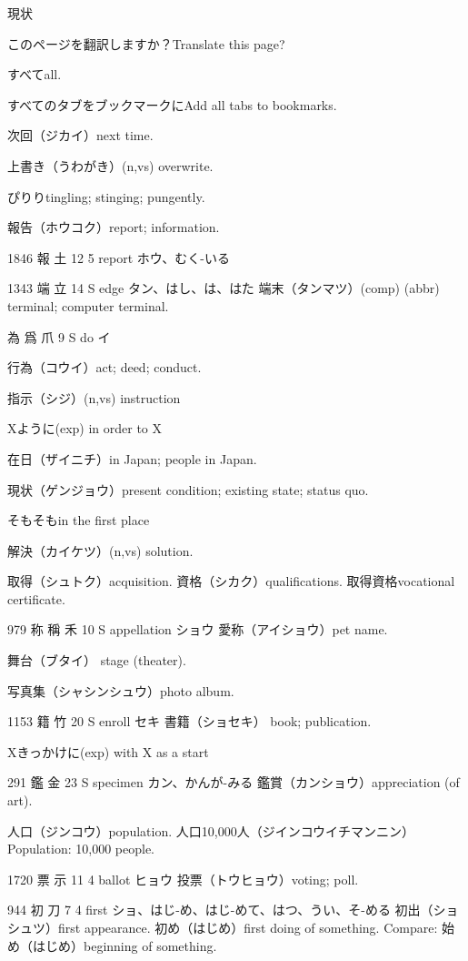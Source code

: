 現状

このページを翻訳しますか？Translate this page?

すべてall.

すべてのタブをブックマークにAdd all tabs to bookmarks.

次回（ジカイ）next time.

上書き（うわがき）(n,vs) overwrite.

ぴりりtingling; stinging; pungently.

報告（ホウコク）report; information.

1846 報  土 12 5  report ホウ、むく-いる

1343 端  立 14 S  edge タン、はし、は、はた
端末（タンマツ）(comp) (abbr) terminal; computer terminal.

為 爲 爪 9 S  do イ

行為（コウイ）act; deed; conduct.

指示（シジ）(n,vs) instruction

Xように(exp) in order to X

在日（ザイニチ）in Japan; people in Japan.

現状（ゲンジョウ）present condition; existing state; status quo.

そもそもin the first place

解決（カイケツ）(n,vs) solution.

取得（シュトク）acquisition.
資格（シカク）qualifications.
取得資格vocational certificate.

979	称	稱	禾	10	S		appellation	ショウ
愛称（アイショウ）pet name.

舞台（ブタイ）
stage (theater).

写真集（シャシンシュウ）photo album.

1153	籍		竹	20	S		enroll	セキ
書籍（ショセキ）
book; publication.

Xきっかけに(exp) with X as a start

291	鑑		金	23	S		specimen	カン、かんが-みる
鑑賞（カンショウ）appreciation (of art).

人口（ジンコウ）population.
人口10,000人（ジインコウイチマンニン）
Population: 10,000 people.

1720	票		示	11	4		ballot	ヒョウ
投票（トウヒョウ）voting; poll.

944	初		刀	7	4		first	ショ、はじ-め、はじ-めて、はつ、うい、そ-める
初出（ショシュツ）first appearance.
初め（はじめ）first doing of something.
Compare: 始め（はじめ）beginning of something.

